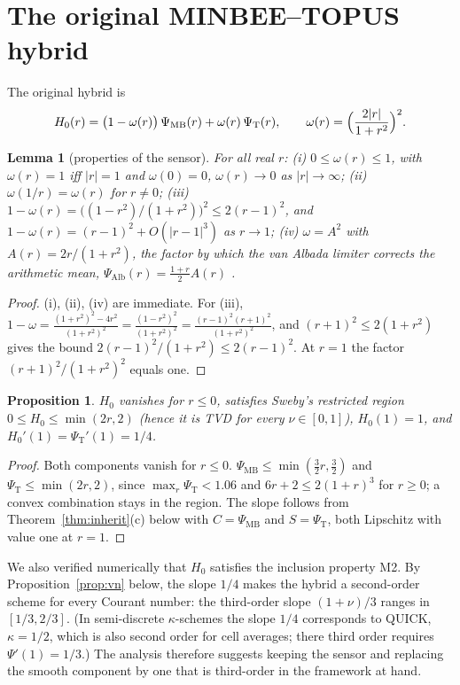 \documentclass[11pt]{article}
\theoremstyle{plain}
\newtheorem{lemma}[theorem]{Lemma}
\newtheorem{proposition}[theorem]{Proposition}
\theoremstyle{definition}
\begin{document}
\section{The original MINBEE--TOPUS hybrid}\label{sec:original}
The original hybrid is
\begin{equation}\label{eq:H0}
H_0(r)=\bigl(1-\omega(r)\bigr)\,\Psi_{\mathrm{MB}}(r)+\omega(r)\,\Psi_{\mathrm T}(r),\qquad \omega(r)=\Bigl(\frac{2|r|}{1+r^2}\Bigr)^2 .
\end{equation}

\begin{lemma}[properties of the sensor]\label{lem:sensor}
For all real $r$:
(i) $0\le\omega(r)\le1$, with $\omega(r)=1$ iff $|r|=1$ and $\omega(0)=0$, $\omega(r)\to0$ as $|r|\to\infty$;
(ii) $\omega(1/r)=\omega(r)$ for $r\ne0$;
(iii) $1-\omega(r)=\bigl((1-r^2)/(1+r^2)\bigr)^2\le 2(r-1)^2$, and $1-\omega(r)=(r-1)^2+O(|r-1|^3)$ as $r\to1$;
(iv) $\omega=A^2$ with $A(r)=2r/(1+r^2)$, the factor by which the van Albada limiter corrects the arithmetic mean, $\Psi_{\mathrm{Alb}}(r)=\frac{1+r}{2}A(r)$ \cite{vanAlbada1982,Kemm2011}.
\end{lemma}
\begin{proof}
(i), (ii), (iv) are immediate. For (iii), $1-\omega=\frac{(1+r^2)^2-4r^2}{(1+r^2)^2}=\frac{(1-r^2)^2}{(1+r^2)^2}=\frac{(r-1)^2(r+1)^2}{(1+r^2)^2}$, and $(r+1)^2\le2(1+r^2)$ gives the bound $2(r-1)^2/(1+r^2)\le2(r-1)^2$. At $r=1$ the factor $(r+1)^2/(1+r^2)^2$ equals one.
\end{proof}

\begin{proposition}\label{prop:H0}
$H_0$ vanishes for $r\le0$, satisfies Sweby's restricted region $0\le H_0\le\min(2r,2)$ (hence it is TVD for every $\nu\in[0,1]$), $H_0(1)=1$, and $H_0'(1)=\Psi_{\mathrm T}'(1)=1/4$.
\end{proposition}
\begin{proof}
Both components vanish for $r\le0$. $\Psi_{\mathrm{MB}}\le\min(\frac32r,\frac32)$ and $\Psi_{\mathrm T}\le\min(2r,2)$, since $\max_r\Psi_{\mathrm T}<1.06$ and $6r+2\le2(1+r)^3$ for $r\ge0$; a convex combination stays in the region. The slope follows from Theorem~\ref{thm:inherit}(c) below with $C=\Psi_{\mathrm{MB}}$ and $S=\Psi_{\mathrm T}$, both Lipschitz with value one at $r=1$.
\end{proof}
We also verified numerically that $H_0$ satisfies the inclusion property M2. By Proposition~\ref{prop:vn} below, the slope $1/4$ makes the hybrid a second-order scheme for every Courant number: the third-order slope $(1+\nu)/3$ ranges in $[1/3,2/3]$. (In semi-discrete $\kappa$-schemes the slope $1/4$ corresponds to QUICK, $\kappa=1/2$, which is also second order for cell averages; there third order requires $\Psi'(1)=1/3$.) The analysis therefore suggests keeping the sensor and replacing the smooth component by one that is third-order in the framework at hand.
\end{document}
